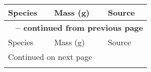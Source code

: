   \centering
  \begin{longtable}{p{} p{} p{}}
    \hline Species & Mass (g) & Source \\ \hline
    \endfirsthead

    \multicolumn{3}{p{\textwidth}}{{ \bfseries \tablename\ \thetable{} -- continued from previous page}} \\
    \hline Species & Mass (g) & Source \\ \hline
    \endhead

    \hline \multicolumn{3}{p{\textwidth}}{{Continued on next page}} \\ \hline
    \endfoot

    \hline \hline
    \endlastfoot


\end{longtable}
